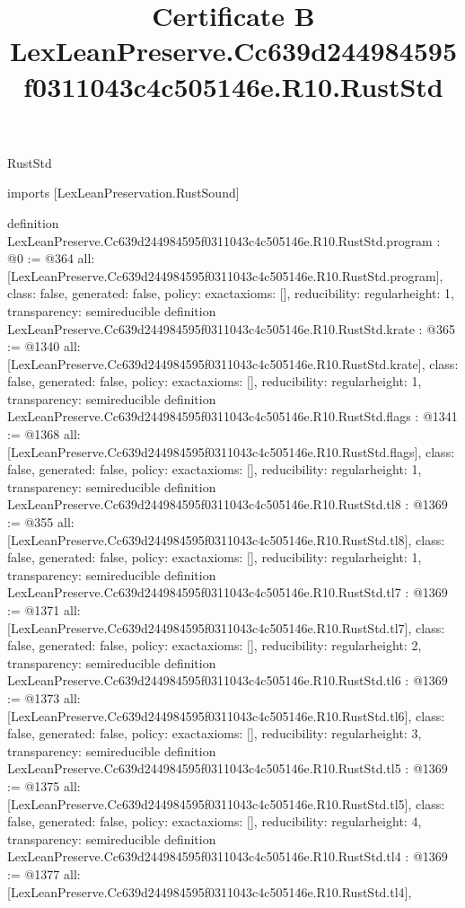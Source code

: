 \begin{lexlean}{RustStd}
\title{Certificate B LexLeanPreserve.Cc639d244984595f0311043c4c505146e.R10.RustStd}
\begin{coremodule}
imports [LexLeanPreservation.RustSound]

definition LexLeanPreserve.Cc639d244984595f0311043c4c505146e.R10.RustStd.program : @0 := @364 {
  all: [LexLeanPreserve.Cc639d244984595f0311043c4c505146e.R10.RustStd.program],
  class: false,
  generated: false,
  policy: exact{axioms: []},
  reducibility: regular{height: 1},
  transparency: semireducible
}
definition LexLeanPreserve.Cc639d244984595f0311043c4c505146e.R10.RustStd.krate : @365 := @1340 {
  all: [LexLeanPreserve.Cc639d244984595f0311043c4c505146e.R10.RustStd.krate],
  class: false,
  generated: false,
  policy: exact{axioms: []},
  reducibility: regular{height: 1},
  transparency: semireducible
}
definition LexLeanPreserve.Cc639d244984595f0311043c4c505146e.R10.RustStd.flags : @1341 := @1368 {
  all: [LexLeanPreserve.Cc639d244984595f0311043c4c505146e.R10.RustStd.flags],
  class: false,
  generated: false,
  policy: exact{axioms: []},
  reducibility: regular{height: 1},
  transparency: semireducible
}
definition LexLeanPreserve.Cc639d244984595f0311043c4c505146e.R10.RustStd.tl8 : @1369 := @355 {
  all: [LexLeanPreserve.Cc639d244984595f0311043c4c505146e.R10.RustStd.tl8],
  class: false,
  generated: false,
  policy: exact{axioms: []},
  reducibility: regular{height: 1},
  transparency: semireducible
}
definition LexLeanPreserve.Cc639d244984595f0311043c4c505146e.R10.RustStd.tl7 : @1369 := @1371 {
  all: [LexLeanPreserve.Cc639d244984595f0311043c4c505146e.R10.RustStd.tl7],
  class: false,
  generated: false,
  policy: exact{axioms: []},
  reducibility: regular{height: 2},
  transparency: semireducible
}
definition LexLeanPreserve.Cc639d244984595f0311043c4c505146e.R10.RustStd.tl6 : @1369 := @1373 {
  all: [LexLeanPreserve.Cc639d244984595f0311043c4c505146e.R10.RustStd.tl6],
  class: false,
  generated: false,
  policy: exact{axioms: []},
  reducibility: regular{height: 3},
  transparency: semireducible
}
definition LexLeanPreserve.Cc639d244984595f0311043c4c505146e.R10.RustStd.tl5 : @1369 := @1375 {
  all: [LexLeanPreserve.Cc639d244984595f0311043c4c505146e.R10.RustStd.tl5],
  class: false,
  generated: false,
  policy: exact{axioms: []},
  reducibility: regular{height: 4},
  transparency: semireducible
}
definition LexLeanPreserve.Cc639d244984595f0311043c4c505146e.R10.RustStd.tl4 : @1369 := @1377 {
  all: [LexLeanPreserve.Cc639d244984595f0311043c4c505146e.R10.RustStd.tl4],
}
\end{coremodule}
\end{lexlean}
